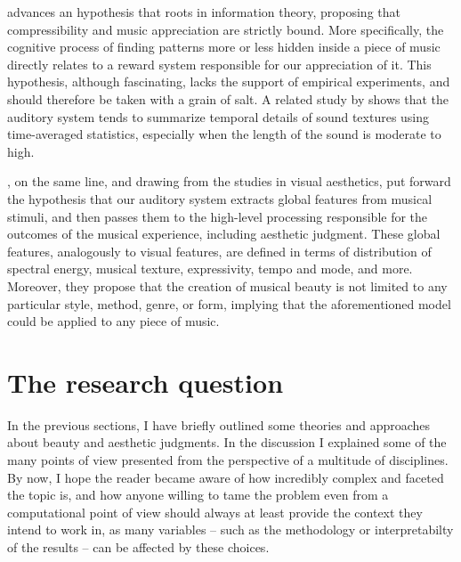 \cite{hudson2011musical} advances an hypothesis that roots in information theory, proposing that compressibility and music appreciation are strictly bound. More specifically, the cognitive process of finding patterns more or less hidden inside a piece of music directly relates to a reward system responsible for our appreciation of it. This hypothesis, although fascinating, lacks the support of empirical experiments, and should therefore be taken with a grain of salt. A related study by \cite{mcdermott2013summary} shows that the auditory system tends to summarize temporal details of sound textures using time-averaged statistics, especially when the length of the sound is moderate to high.

\cite{brattico2017global}, on the same line, and drawing from the studies in visual aesthetics, put forward the hypothesis that our auditory system extracts global features from musical stimuli, and then passes them to the high-level processing responsible for the outcomes of the musical experience, including aesthetic judgment. These global features, analogously to visual features, are defined in terms of distribution of spectral energy, musical texture, expressivity, tempo and mode, and more. Moreover, they propose that the creation of musical beauty is not limited to any particular style, method, genre, or form, implying that the aforementioned model could be applied to any piece of music.

\section{The research question}\label{sec:question}
In the previous sections, I have briefly outlined some theories and approaches about beauty and aesthetic judgments. In the discussion I explained some of the many points of view presented from the perspective of a multitude of disciplines. By now, I hope the reader became aware of how incredibly complex and faceted the topic is, and how anyone willing to tame the problem even from a computational point of view should always at least provide the context they intend to work in, as many variables -- such as the methodology or interpretabilty of the results -- can be affected by these choices.

